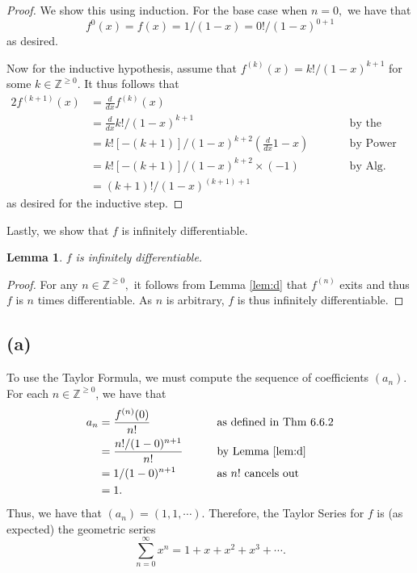 \documentclass[10pt]{article}
\newtheorem{lemma}[]{Lemma}
\begin{document}
\begin{proof}
    We show this using induction. For the base case when $n=0,$ we have that
    \[f^{0}(x)=f(x)=1/(1-x)=0!/(1-x)^{0+1}\]
    as desired.

    Now for the inductive hypothesis, assume that $f^{(k)}(x)=k!/(1-x)^{k+1}$ for some $k\in\mathbb{Z}^{\ge 0}.$ It thus follows that
    \begin{alignat*}{2}
        f^{(k+1)}(x) &= \frac{d}{dx}f^{(k)}(x)\\
        &= \frac{d}{dx} k!/(1-x)^{k+1} &&\text{by the Inductive Hypothesis}\\
        &= k![-(k+1)]/(1-x)^{k+2}\left ( \frac{d}{dx}1-x \right )\qquad&&\text{by Power Rule and Chain Rule}\\
        &= k![-(k+1)]/(1-x)^{k+2} \times (-1) &&\text{by Alg. Diff. Theorem}\\
        &= (k+1)!/(1-x)^{(k+1)+1}
    \end{alignat*}
    as desired for the inductive step.
\end{proof}

\noindent
Lastly, we show that $f$ is infinitely differentiable.

\begin{lemma} \label{lem:i}
    $f$ is infinitely differentiable.
\end{lemma}

\begin{proof}
    For any $n\in\mathbb{Z}^{\ge0},$ it follows from Lemma \ref{lem:d} that $f^{(n)}$ exits and thus $f$ is $n$ times differentiable. As $n$ is arbitrary, $f$ is thus infinitely differentiable.
\end{proof}
\subsection*{(a)}
To use the Taylor Formula, we must compute the sequence of coefficients $(a_n).$ For each $n\in\mathbb{Z}^{\ge 0}$, we have that
\begin{alignat*}{2}
    a_n &= \frac{f^{(n)}(0)}{n!} && \text{as defined in Thm 6.6.2}\\
    &= \frac{n!/(1-0)^{n+1}}{n!} \qquad&&\text{by Lemma \ref{lem:d}}\\
    &= 1/(1-0)^{n+1} &&\text{as $n!$ cancels out}\\
    &= 1.
\end{alignat*}
Thus, we have that $(a_n) = (1,1,\cdots).$
Therefore, the Taylor Series for $f$ is (as expected) the geometric series
\[\sum_{n=0}^{\infty}x^n=1+x+x^2+x^3+\cdots.\]
\end{document}
